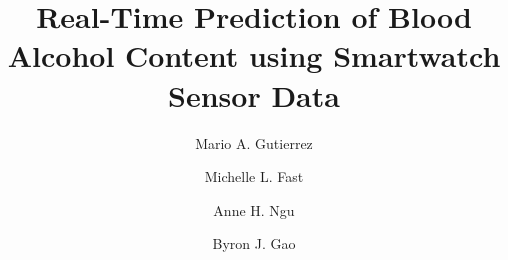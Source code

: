 \documentclass{../sty/llncs}
\begin{document}
\title{Real-Time Prediction of Blood Alcohol Content using Smartwatch Sensor Data}

\author{Mario A. Gutierrez \and Michelle L. Fast \and Anne H. Ngu \and  Byron J. Gao}

\maketitle












\end{document}
